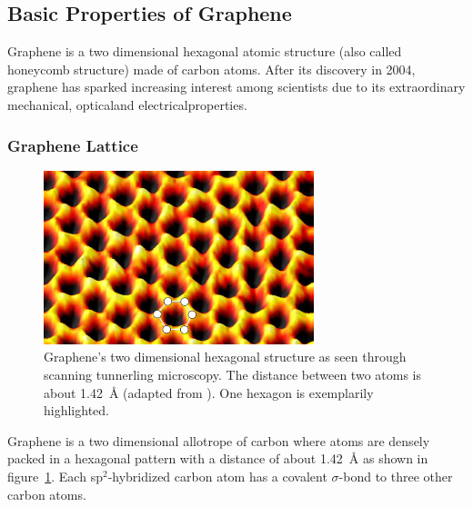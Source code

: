 \subsection{Basic Properties of Graphene}

Graphene is a two dimensional hexagonal atomic structure (also called honeycomb structure) made of carbon atoms. After its discovery in 2004\cite{novoselov}, graphene has sparked increasing interest among scientists due to its extraordinary mechanical\mcite, optical\mcite and electrical\mcite properties. 

\subsubsection{Graphene Lattice}
\begin{figure}[!h]
  \centering
  \includegraphics[width=0.7\textwidth]{./images/graphene-spm.png}
  \caption{Graphene's two dimensional hexagonal structure as seen through scanning tunnerling microscopy. The distance between two atoms is about \SI{1.42}{\angstrom} (adapted from \mcite). One hexagon is exemplarily highlighted.}
  \label{fig:spm}
\end{figure}

Graphene is a two dimensional allotrope of carbon where atoms are densely packed in a hexagonal pattern with a distance of about \SI{1.42}{\angstrom} as shown in figure~\ref{fig:spm}. Each sp$^2$-hybridized carbon atom has a covalent $\sigma$-bond to three other carbon atoms.

